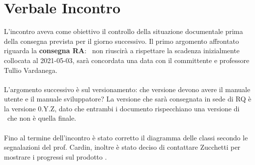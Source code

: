 \section{Verbale Incontro}
    L'incontro aveva come obiettivo il controllo della situazione documentale prima della consegna prevista per il giorno successivo.
    Il primo argomento affrontato riguarda la \textbf{consegna RA}: \cod\ non riuscirà a rispettare la scadenza inizialmente collocata al 2021-05-03, sarà concordata una data con il committente e professore Tullio Vardanega.
    \\ \\
    \noindent L'argomento successivo è sul versionamento: che versione devono avere il manuale utente e il manuale sviluppatore? La versione che sarà consegnata in sede di RQ è la versione 0.Y.Z, dato che entrambi i documento rispecchiano una versione di \hd\ che non è quella finale.
    \\ \\ 
    \noindent Fino al termine dell'incontro è stato corretto il diagramma delle classi secondo le segnalazioni del prof. Cardin, inoltre è stato deciso di contattare Zucchetti per mostrare i progressi sul prodotto \hd .